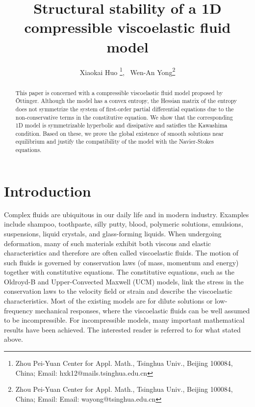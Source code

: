 \documentclass{article}
\theoremstyle{plain}
\begin{document}
\newtheorem{thm}{Theorem}
\newtheorem{lemma}{Lemma}
\theoremstyle{definition}
\theoremstyle{Remark}
\newtheorem{rem}{Remark}
\newtheorem{defn}{Definition}

\title{Structural stability of a 1D compressible viscoelastic fluid model}

\author{Xiaokai Huo \footnote{Zhou Pei-Yuan Center for Appl. Math., Tsinghua Univ., Beijing 100084, China; Email:
hxk12@mails.tsinghua.edu.cn},
~Wen-An Yong\footnote{Zhou Pei-Yuan Center for Appl. Math., Tsinghua Univ., Beijing 100084, China; Email:
Email: wayong@tsinghua.edu.cn}}

\date{}


\maketitle

\begin{abstract}

This paper is concerned with a compressible viscoelastic fluid model proposed by \"Ottinger.
Although the model has a convex entropy, the Hessian matrix of the entropy does not symmetrize the system of first-order partial differential equations due to the non-conservative terms in the constitutive equation. We show that the corresponding 1D model is symmetrizable hyperbolic and dissipative and satisfies the Kawashima condition. Based on these, we prove the global existence of smooth solutions near equilibrium and justify the compatibility of the model with the Navier-Stokes equations.

\end{abstract}

\section{Introduction}

Complex fluids are ubiquitous in our daily life and in modern industry.
Examples include shampoo, toothpaste, silly putty, blood, polymeric solutions, emulsions, suspensions, liquid crystals, and glass-forming liquids.
When undergoing deformation, many of such materials exhibit both viscous and elastic characteristics and therefore
are often called viscoelastic fluids. The motion of such fluids is governed by conservation laws (of mass, momentum and energy) together with constitutive equations.
The constitutive equations, such as the Oldroyd-B and Upper-Convected Maxwell (UCM) models, link the stress in the conservation laws to the velocity field or strain and describe the viscoelastic characteristics. Most of the existing models are for dilute solutions or low-frequency mechanical responses, where the viscoelastic fluids can be well assumed to be incompressible. For incompressible models, many important mathematical results have been achieved. The interested reader is referred to \cite{larson1999structure,squires2009fluid,lin2012some,renardy2008mathematical} for what stated above.
\end{document}
